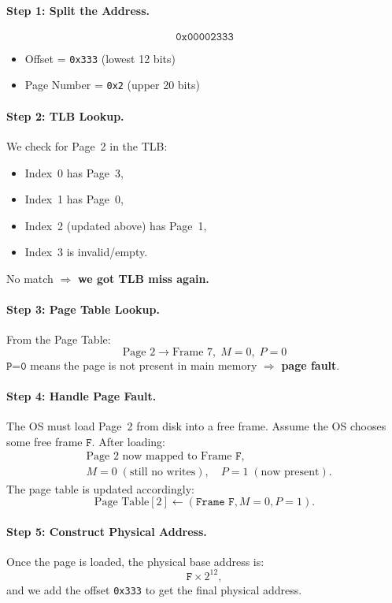 \documentclass{article}
\begin{document}
\paragraph{Step 1: Split the Address.}
\[
\texttt{0x00002333}
\]
\begin{itemize}
  \item Offset = \texttt{0x333} (lowest 12 bits)
  \item Page Number = \texttt{0x2} (upper 20 bits)
\end{itemize}

\paragraph{Step 2: TLB Lookup.}
We check for Page~2 in the TLB:
\begin{itemize}
  \item Index~0 has Page~3,
  \item Index~1 has Page~0,
  \item Index~2 (updated above) has Page~1,
  \item Index~3 is invalid/empty.
\end{itemize}
No match $\Rightarrow$ \textbf{we got TLB miss again.}

\paragraph{Step 3: Page Table Lookup.}
From the Page Table:
\[
\text{Page~2} \longrightarrow \text{Frame~7}, \; M=0, \; P=0
\]
\(\texttt{P=0}\) means the page is not present in main memory $\Rightarrow$ \textbf{page fault}.

\paragraph{Step 4: Handle Page Fault.}
The OS must load Page~2 from disk into a free frame. Assume the OS chooses some free frame \(\texttt{F}\). After loading:
\[
\begin{aligned}
  &\text{Page~2 now mapped to Frame } \texttt{F}, \\
  &M=0 \;(\text{still no writes}), \quad P=1 \;(\text{now present}).
\end{aligned}
\]
The page table is updated accordingly:
\[
\text{Page Table}[2] \gets (\texttt{Frame~F}, M=0, P=1).
\]

\paragraph{Step 5: Construct Physical Address.}
Once the page is loaded, the physical base address is:
\[
\texttt{F} \times 2^{12},
\]
and we add the offset \texttt{0x333} to get the final physical address.
\end{document}
